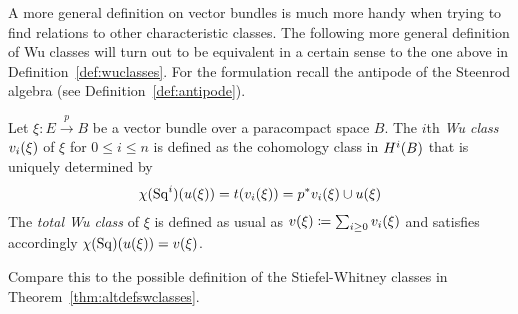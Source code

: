 A more general definition on vector bundles is much more handy when
trying to find relations to other characteristic classes.
The following more general definition of Wu classes
will turn out to be equivalent in a certain sense to the one above in
Definition~\ref{def:wuclasses}.
For the formulation recall the antipode of the Steenrod algebra
(see Definition~\ref{def:antipode}).
\begin{Def}\label{def:altwuclasses}
  Let $\xi\colon E\xrightarrow{p} B$ be a vector bundle over a
  paracompact space $B$.
  The $i$th \emph{Wu class} ${v_{i}}(\xi)$ of $\xi$ for $0\leq i\leq n$
  is defined as the cohomology class in $H^i(B)$ that is uniquely
  determined by
  \begin{gather*}
    \chi(\mathrm{Sq}^{i})({u}(\xi)) = t({v_{i}}(\xi)) = {p}^* {v_{i}}(\xi) \cup {u}(\xi)
  \end{gather*}
  The \emph{total Wu class} of $\xi$ is defined as usual as
  ${v}(\xi)\coloneqq\sum_{i\geq0}{v_{i}}(\xi)$ and satisfies accordingly 
  $\chi(\mathrm{Sq})({u}(\xi))={v}(\xi)$.
\end{Def}
\begin{Rem}
  Compare this to the possible definition of the Stiefel-Whitney
  classes in Theorem~\ref{thm:altdefswclasses}.
\end{Rem}

